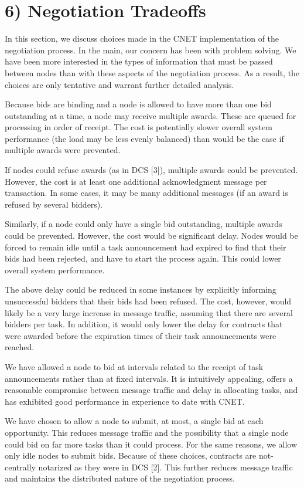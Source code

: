 \documentclass[
]{article}
\begin{document}
\section{6) Negotiation Tradeoffs}\label{negotiation-tradeoffs}

In this section, we discuss choices made in the CNET implementation of
the negotiation process. In the main, our concern has been with problem
solving. We have been more interested in the types of information that
must be passed between nodes than with these aspects of the negotiation
process. As a result, the choices are only tentative and warrant further
detailed analysis.

Because bids are binding and a node is allowed to have more than one bid
outstanding at a time, a node may receive multiple awards. These are
queued for processing in order of receipt. The cost is potentially
slower overall system performance (the load may be less evenly balanced)
than would be the case if multiple awards were prevented.

If nodes could refuse awards (as in DCS {[}3{]}), multiple awards could
be prevented. However, the cost is at least one additional
acknowledgment message per transaction. In some cases, it may be many
additional messages (if an award is refused by several bidders).

Similarly, if a node could only have a single bid outstanding, multiple
awards could be prevented. However, the cost would be significant delay.
Nodes would be forced to remain idle until a task announcement had
expired to find that their bids had been rejected, and have to start the
process again. This could lower overall system performance.

The above delay could be reduced in some instances by explicitly
informing unsuccessful bidders that their bids had been refused. The
cost, however, would likely be a very large increase in message traffic,
assuming that there are several bidders per task. In addition, it would
only lower the delay for contracts that were awarded before the
expiration times of their task announcements were reached.

We have allowed a node to bid at intervals related to the receipt of
task announcements rather than at fixed intervals. It is intuitively
appealing, offers a reasonable compromise between message traffic and
delay in allocating tasks, and has exhibited good performance in
experience to date with CNET.

We have chosen to allow a node to submit, at most, a single bid at each
opportunity. This reduces message traffic and the possibility that a
single node could bid on far more tasks than it could process. For the
same reasons, we allow only idle nodes to submit bids. Because of these
choices, contracts are not-centrally notarized as they were in DCS
{[}2{]}. This further reduces message traffic and maintains the
distributed nature of the negotiation process.
\end{document}
